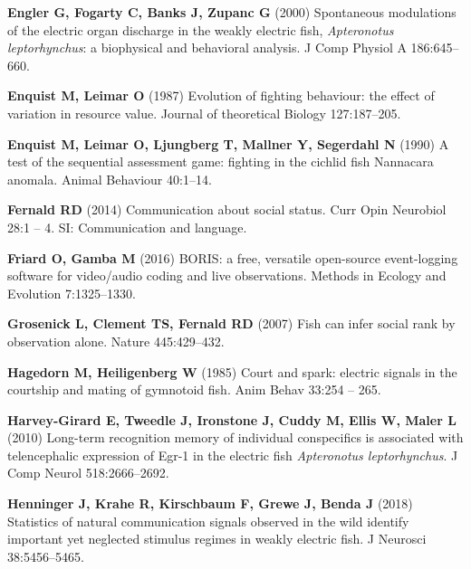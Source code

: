 \documentclass[vruler,JEB]{COB}%
\begin{document}
\begin{thebibliography}{70}
\textbf{Engler G, Fogarty C, Banks J, Zupanc G} (2000) Spontaneous modulations of the
  electric organ discharge in the weakly electric fish, \textit{Apteronotus
  leptorhynchus}: a biophysical and behavioral analysis.
 J Comp Physiol A 186:645--660.

\textbf{Enquist M, Leimar O} (1987) Evolution of fighting behaviour: the effect of
  variation in resource value.
 Journal of theoretical Biology 127:187--205.

\textbf{Enquist M, Leimar O, Ljungberg T, Mallner Y, Segerdahl N} (1990) A test of the
  sequential assessment game: fighting in the cichlid fish Nannacara anomala.
 Animal Behaviour 40:1--14.

\textbf{Fernald RD} (2014) Communication about social status.
 Curr Opin Neurobiol 28:1 -- 4.
 SI: Communication and language.

\textbf{Friard O, Gamba M} (2016) BORIS: a free, versatile open-source event-logging
  software for video/audio coding and live observations.
 Methods in Ecology and Evolution 7:1325--1330.

\textbf{Grosenick L, Clement TS, Fernald RD} (2007) Fish can infer social rank by
  observation alone.
 Nature 445:429--432.

\textbf{Hagedorn M, Heiligenberg W} (1985) Court and spark: electric signals in the
  courtship and mating of gymnotoid fish.
 Anim Behav 33:254 -- 265.

\textbf{Harvey-Girard E, Tweedle J, Ironstone J, Cuddy M, Ellis W, Maler L} (2010)
  Long-term recognition memory of individual conspecifics is associated with
  telencephalic expression of {Egr-1} in the electric fish \textit{Apteronotus
  leptorhynchus}.
 J Comp Neurol 518:2666--2692.

\textbf{Henninger J, Krahe R, Kirschbaum F, Grewe J, Benda J} (2018) Statistics of
  natural communication signals observed in the wild identify important yet
  neglected stimulus regimes in weakly electric fish.
 J Neurosci 38:5456--5465.


\end{thebibliography}
\end{document}
